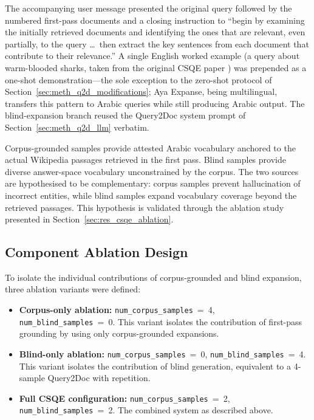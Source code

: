 \noindent The accompanying user message presented the original query followed by the numbered first-pass documents and a closing instruction to ``begin by examining the initially retrieved documents and identifying the ones that are relevant, even partially, to the query \ldots\ then extract the key sentences from each document that contribute to their relevance.'' A single English worked example (a query about warm-blooded sharks, taken from the original CSQE paper \cite{lei_2024_csqe}) was prepended as a one-shot demonstration---the sole exception to the zero-shot protocol of Section~\ref{sec:meth_q2d_modifications}; Aya Expanse, being multilingual, transfers this pattern to Arabic queries while still producing Arabic output. The blind-expansion branch reused the Query2Doc system prompt of Section~\ref{sec:meth_q2d_llm} verbatim.

Corpus-grounded samples provide attested Arabic vocabulary anchored to the actual Wikipedia passages retrieved in the first pass. Blind samples provide diverse answer-space vocabulary unconstrained by the corpus. The two sources are hypothesised to be complementary: corpus samples prevent hallucination of incorrect entities, while blind samples expand vocabulary coverage beyond the retrieved passages. This hypothesis is validated through the ablation study presented in Section~\ref{sec:res_csqe_ablation}.

\subsection{Component Ablation Design}
\label{sec:meth_csqe_ablation}

To isolate the individual contributions of corpus-grounded and blind expansion, three ablation variants were defined:

\begin{itemize}
    \item \textbf{Corpus-only ablation:} \texttt{num\_corpus\_samples}~=~4, \texttt{num\_blind\_samples}~=~0. This variant isolates the contribution of first-pass grounding by using only corpus-grounded expansions.
    \item \textbf{Blind-only ablation:} \texttt{num\_corpus\_samples}~=~0, \texttt{num\_blind\_samples}~=~4. This variant isolates the contribution of blind generation, equivalent to a 4-sample Query2Doc with repetition.
    \item \textbf{Full CSQE configuration:} \texttt{num\_corpus\_samples}~=~2, \texttt{num\_blind\_samples}~=~2. The combined system as described above.
\end{itemize}


